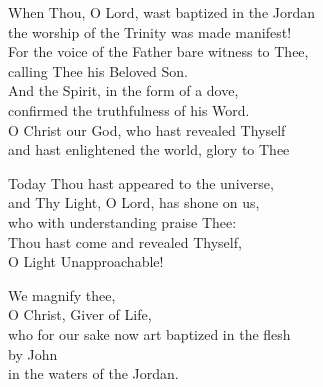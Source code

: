 \documentclass{article}
\begin{document}
%
When Thou, O Lord, wast baptized in the Jordan \\
the worship of the Trinity was made manifest! \\
For the voice of the Father bare witness to Thee,\\
calling Thee his Beloved Son.\\
And the Spirit, in the form of a dove,\\
confirmed the truthfulness of his Word. \\
O Christ our God, who hast revealed Thyself\\
and hast enlightened the world, glory to Thee

Today Thou hast appeared to the universe,\\
and Thy Light, O Lord, has shone on us,\\
who with understanding praise Thee: \\
Thou hast come and revealed Thyself,\\
O Light Unapproachable!

We magnify thee,\\
O Christ, Giver of Life, \\
who for our sake now art baptized in the flesh\\
by John\\
in the waters of the Jordan.
\end{document}

